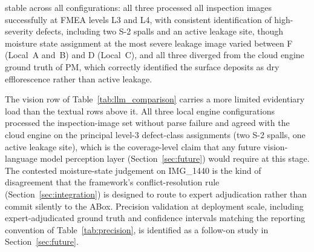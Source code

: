 \documentclass[11pt,a4paper]{article}
\begin{document}
stable across all configurations: all three processed all inspection images successfully at FMEA levels L3 and L4, with consistent identification of high-severity defects, including two S-2 spalls and an active leakage site, though moisture state assignment at the most severe leakage image varied between F (Local~A and~B) and D (Local~C), and all three diverged from the cloud engine ground truth of PM, which correctly identified the surface deposits as dry efflorescence rather than active leakage.

The vision row of Table~\ref{tab:llm_comparison} carries a more limited evidentiary load than the textual rows above it. All three local engine configurations processed the inspection-image set without parse failure and agreed with the cloud engine on the principal level-3 defect-class assignments (two S-2 spalls, one active leakage site), which is the coverage-level claim that any future vision-language model perception layer (Section~\ref{sec:future}) would require at this stage. The contested moisture-state judgement on IMG\_1440 is the kind of disagreement that the framework's conflict-resolution rule (Section~\ref{sec:integration}) is designed to route to expert adjudication rather than commit silently to the ABox. Precision validation at deployment scale, including expert-adjudicated ground truth and confidence intervals matching the reporting convention of Table~\ref{tab:precision}, is identified as a follow-on study in Section~\ref{sec:future}.
\end{document}

